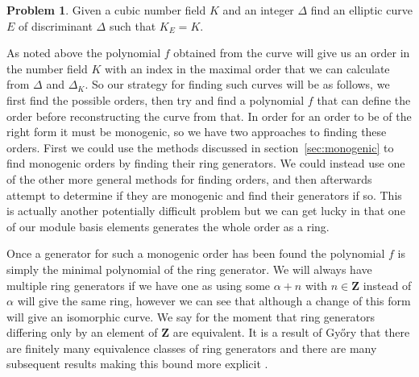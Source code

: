 \documentclass[12pt,a4paper,abstracton,bibtotoc]{scrreprt}
\theoremstyle{definition}
\newtheorem{prob}{Problem}
\newcommand{\ZZ}{\mathbf{Z}}
\begin{document}
\begin{prob}
Given a cubic number field $K$ and an integer $\Delta$ find an elliptic curve $E$ of discriminant $\Delta$ such that $K_E = K$.
\end{prob}

As noted above the polynomial $f$ obtained from the curve will give us an order in the number field $K$ with an index in the maximal order that we can calculate from $\Delta$ and $\Delta_K$.
So our strategy for finding such curves will be as follows, we first find the possible orders, then try and find a polynomial $f$ that can define the order before reconstructing the curve from that.
In order for an order to be of the right form it must be monogenic, so we have two approaches to finding these orders.
First we could use the methods discussed in section~\ref{sec:monogenic} to find monogenic orders by finding their ring generators.
We could instead use one of the other more general methods for finding orders, and then afterwards attempt to determine if they are monogenic and find their generators if so.
This is actually another potentially difficult problem but we can get lucky in that one of our module basis elements generates the whole order as a ring.

Once a generator for such a monogenic order has been found the polynomial $f$ is simply the minimal polynomial of the ring generator.
We will always have multiple ring generators if we have one as using some $\alpha + n$ with $n\in \ZZ$ instead of $\alpha$ will give the same ring, however we can see that although a change of this form will give an isomorphic curve.
We say for the moment that ring generators differing only by an element of $\ZZ$ are equivalent.
It is a result of Gy\H{o}ry that there are finitely many equivalence classes of ring generators and there are many subsequent results making this bound more explicit \cite{monogenic}.

\end{document}
